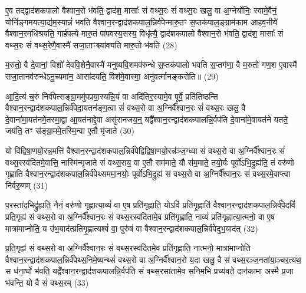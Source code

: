 ए॒व तद्द्वाद॑शकपालो वैश्वान॒रो भ॑वति॒ द्वाद॑श॒ मासाः᳚ सं वथ्स॒रः सं॑ वथ्स॒रः खलु॒ वा अ॒ग्नेर्योनिः॒ स्वामे॒वैनं॒ योनि॑ङ्गमयत्या॒द्य॑म॒स्यान्नं॑ भवति वैश्वान॒रन्द्वाद॑शकपाल॒न्निर्व॑पेन्मारु॒तꣳ स॒प्तक॑पाल॒ङ्ग्राम॑काम आहव॒नीये॑ वैश्वान॒रमधि॑श्रयति॒ गार्\mbox{}ह॑पत्ये मारु॒तं पा॑पवस्य॒सस्य॒ विधृ॑त्यै॒ द्वाद॑शकपालो वैश्वान॒रो भ॑वति॒ द्वाद॑श॒ मासाः᳚ सं वथ्स॒रः सं॑ वथ्स॒रेणै॒वास्मै॑ सजा॒ताꣳश्च्या॑वयति मारु॒तो भ॑वति (28)

म॒रुतो॒ वै दे॒वानां॒ विशो॑ देववि॒शेनै॒वास्मै॑ मनुष्यवि॒शमव॑रुन्धे स॒प्तक॑पालो भवति स॒प्तग॑णा॒ वै म॒रुतो॑ गण॒श ए॒वास्मै॑ सजा॒तानव॑रुन्धे\-ऽनू॒च्यमा॑न॒ आसा॑दयति॒ विश॑मे॒वास्मा॒ अनु॑वर्त्मानङ्करोति॥ (29)

{\anuvakamend[{प्र॒जाका॑मः सं वथ्स॒रः पु॒नात्ये॒वैनं॑ पू॒तः सम॑ष्ट्यै ता॒दृङ्मा॑रु॒तो भ॑व॒त्येका॒न्नत्रि॒ꣳ॒शच्च॑॥५॥}]}

आ॒दि॒त्यं च॒रुं निर्व॑पेत्सङ्ग्रा॒ममु॑पप्रया॒स्यन्नि॒यं वा अदि॑तिर॒स्यामे॒व पूर्वे॒ प्रति॑तिष्ठन्ति वैश्वान॒रन्द्वाद॑शकपाल॒न्निर्व॑पेदा॒यतन॑ङ्ग॒त्वा सं॑ वथ्स॒रो वा अ॒ग्निर्वै᳚श्वान॒रः सं॑ वथ्स॒रः खलु॒ वै दे॒वाना॑मा॒यत॑नमे॒तस्मा॒द्वा आ॒यत॑नाद्दे॒वा असु॑रानजय॒न्॒ यद्वै᳚श्वान॒रन्द्वाद॑शकपालन्नि॒र्वप॑ति दे॒वाना॑मे॒वायत॑ने यतते॒ जय॑ति॒ तꣳ स॑ङ्ग्रा॒ममे॒तस्मि॒न्वा ए॒तौ मृ॑जाते (30)

यो वि॑द्विषा॒णयो॒रन्न॒मत्ति॑ वैश्वान॒रन्द्वाद॑शकपाल॒न्निर्व॑पेद्विद्विषा॒णयो॒रन्न॑ञ्ज॒ग्ध्वा सं॑ वथ्स॒रो वा अ॒ग्निर्वै᳚श्वान॒रः सं॑ वथ्स॒रस्व॑दितमे॒वात्ति॒ नास्मि॑न्मृजाते सं वथ्स॒राय॒ वा ए॒तौ सम॑माते॒ यौ स॑म॒माते॒ तयो॒र्यः पूर्वो॑\-ऽभि॒द्रुह्य॑ति॒ तं वरु॑णो गृह्णाति वैश्वान॒रन्द्वाद॑शकपाल॒न्निर्व॑पेथ्सममा॒नयोः॒ पूर्वो॑\-ऽभि॒द्रुह्य॑ सं वथ्स॒रो वा अ॒ग्निर्वै᳚श्वान॒रः सं॑ वथ्स॒रमे॒वाप्त्वा नि॑र्वरु॒णम् (31)

प॒रस्ता॑द॒भिद्रु॑ह्यति॒ नैनं॒ वरु॑णो गृह्णात्या॒व्यं॑ वा ए॒ष प्रति॑गृह्णाति॒ यो\-ऽविं॑ प्रतिगृ॒ह्णाति॑ वैश्वान॒रन्द्वाद॑शकपाल॒न्निर्व॑पे॒दविं॑ प्रति॒गृह्य॑ सं वथ्स॒रो वा अ॒ग्निर्वै᳚श्वान॒रः सं॑ वथ्स॒रस्व॑दितामे॒व प्रति॑गृह्णाति॒ नाव्यं॑ प्रति॑गृह्णात्या॒त्मनो॒ वा ए॒ष मात्रा॑माप्नोति॒ य उ॑भ॒याद॑त्प्रतिगृ॒ह्णात्यश्वं॑ वा॒ पुरु॑षं वा वैश्वान॒रन्द्वाद॑शकपाल॒न्निर्व॑पेदुभ॒याद॑त् (32)

प्र॒ति॒गृह्य॑ सं वथ्स॒रो वा अ॒ग्निर्वै᳚श्वान॒रः सं॑ वथ्स॒रस्व॑दितमे॒व प्रति॑गृह्णाति॒ नात्मनो॒ मात्रा॑माप्नोति वैश्वान॒रन्द्वाद॑शकपाल॒न्निर्व॑पेथ्स॒निमे॒ष्यन्थ्सं॑ वथ्स॒रो वा अ॒ग्निर्वै᳚श्वान॒रो य॒दा खलु॒ वै सं॑ वथ्स॒रञ्ज॒नता॑या॒ञ्चर॒त्यथ॒ स ध॑ना॒र्घो भ॑वति॒ यद्वै᳚श्वान॒रन्द्वाद॑शकपालन्नि॒र्वप॑ति सं वथ्स॒रसा॑तामे॒व स॒निम॒भि प्रच्य॑वते॒ दान॑कामा अस्मै प्र॒जा भ॑वन्ति॒ यो वै सं॑ वथ्स॒रम् (33)

